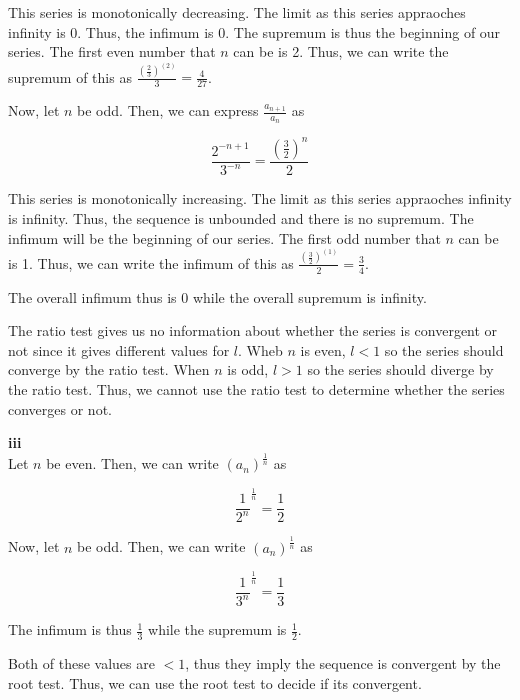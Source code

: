 \documentclass[addpoints]{exam}
\begin{document}
\begin{questions}
This series is monotonically decreasing. The limit as this series appraoches infinity is 0. Thus, the infimum is 0. 
The supremum is thus the beginning of our series. The first even number that $n$ can be is 2. Thus, we can write the supremum of this 
as $\frac{(\frac{2}{3})^(2)}{3} = \frac{4}{27}$. 

Now, let $n$ be odd. Then, we can express $\frac{a_{n+1}}{a_n}$ as 

\[\frac{2^{-n + 1}}{3^{-n}} = \frac{(\frac{3}{2})^n}{2}\]

This series is monotonically increasing. The limit as this series appraoches infinity is infinity. Thus, the sequence is unbounded
and there is no supremum. The infimum will be the beginning of our series. The first odd number that $n$ can be is 1. Thus, we can write the infimum of this
as $\frac{(\frac{3}{2})^(1)}{2} = \frac{3}{4}$.

The overall infimum thus is 0 while the overall supremum is infinity. 

The ratio test gives us no information about whether the series is convergent or not since it gives different values for $l$.
Wheb $n$ is even, $l < 1$ so the series should converge by the ratio test. When $n$ is odd, $l > 1$ so the series should diverge by the ratio test.
Thus, we cannot use the ratio test to determine whether the series converges or not.

\textbf{iii} \\

Let $n$ be even. Then, we can write $(a_n)^{\frac{1}{n}}$ as 

\[\frac{1}{2^n}^{\frac{1}{n}} = \frac{1}{2}\]

Now, let $n$ be odd. Then, we can write $(a_n)^{\frac{1}{n}}$ as 

\[\frac{1}{3^n}^{\frac{1}{n}} = \frac{1}{3}\]

The infimum is thus $\frac{1}{3}$ while the supremum is $\frac{1}{2}$.

Both of these values are $< 1$, thus they imply the sequence is convergent by the root test. Thus, we can use the root test to decide
if its convergent. 

\question

\question 

\question 
\end{questions}
\end{document}
